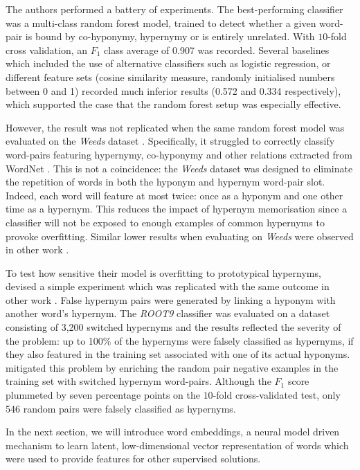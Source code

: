 The authors performed a  battery of experiments.  The best-performing classifier was a multi-class random forest model, trained to detect whether a given word-pair is bound by co-hyponymy, hypernymy or is entirely unrelated.  With $10$-fold cross validation, an $F_1$ class average of 0.907 was recorded.  Several baselines which included the use of alternative classifiers such as logistic regression, or different feature sets (cosine similarity measure, randomly initialised numbers between 0 and 1) recorded much inferior results (0.572 and 0.334 respectively), which supported the case that the random forest setup was especially effective.  

However, the result was not replicated when the same random forest model was evaluated on the \textit{Weeds} dataset \citep{weeds2014learning}.  Specifically, it struggled to correctly classify word-pairs featuring hypernymy, co-hyponymy and other relations extracted from WordNet \citep{Miller1995}.  This is not a coincidence: the \textit{Weeds} dataset was designed to eliminate the repetition of words in both the hyponym and hypernym word-pair slot.  Indeed, each word will feature at most twice: once as a hyponym and one other time as a hypernym.  This reduces the impact of hypernym memorisation \citep{levy2015supervised} since a classifier will not be exposed to enough examples of common hypernyms to provoke overfitting.  Similar lower results when evaluating on \textit{Weeds} were observed in other work \citep{shwartz2017siege}.

To test how sensitive their model is overfitting to prototypical hypernyms, \citeauthor{santus2016nine} devised a simple experiment which was replicated with the same outcome in other work \citep{shwartz2017siege}.  False hypernym pairs were generated by linking a hyponym with another word’s hypernym.  The \textit{ROOT9} classifier was evaluated on a dataset consisting of 3,200 switched hypernyms and the results reflected the severity of the problem:  up to 100\% of the hypernyms were falsely classified as hypernyms, if they also featured in the training set associated with one of its actual hyponyms.  \citeauthor{santus2016nine} mitigated this problem by enriching the random pair negative examples in the training set with switched hypernym word-pairs.  Although the $F_1$ score plummeted by seven percentage points on the $10$-fold cross-validated test, only 546 random pairs were falsely classified as hypernyms.

In the next section, we will introduce word embeddings, a neural model driven mechanism to learn latent, low-dimensional vector representation of words which were used to provide features for other supervised solutions.

